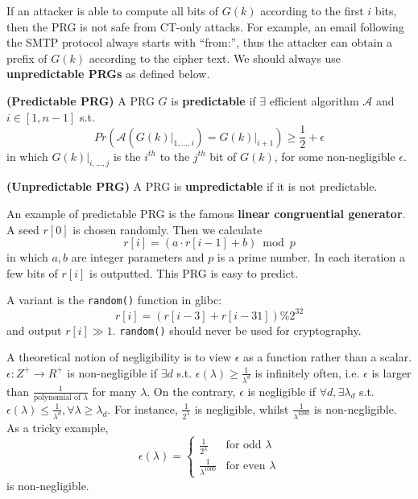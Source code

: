 If an attacker is able to compute all bits of $G(k)$ according to the first $i$ bits, then the PRG is not safe from CT-only attacks. For example, an email following the SMTP protocol always starts with ``from:'', thus the attacker can obtain a prefix of $G(k)$ according to the cipher text. We should always use \textbf{unpredictable PRGs} as defined below.
\begin{definition}\textbf{(Predictable PRG)}
A PRG $G$ is \textbf{predictable} if $\exists$ efficient algorithm $\mathcal{A}$ and $i\in[1,n-1]$ s.t. 
\begin{equation*}
Pr\left(\mathcal{A}\left(\left.G(k)\right\vert_{1,\dots,i}\right)=\left.G(k)\right\vert_{i+1}\right)\geq\frac{1}{2}+\epsilon
\end{equation*}
in which $G(k)\vert_{i,...,j}$ is the $i^{th}$ to the $j^{th}$ bit of ${G(k)}$, for some non-negligible $\epsilon$. 
\end{definition}
\begin{definition}\textbf{(Unpredictable PRG)}
A PRG is \textbf{unpredictable} if it is not predictable. 
\end{definition}
An example of predictable PRG is the famous \textbf{linear congruential generator}. A seed $r[0]$ is chosen randomly. Then we calculate
\begin{equation*}
r[i]=(a\cdot r[i-1]+b)\bmod p
\end{equation*}
in which $a,b$ are integer parameters and $p$ is a prime number. In each iteration a few bits of $r[i]$ is outputted. This PRG is easy to predict. 

A variant is the \texttt{random()} function in glibc:
\begin{equation*}
r[i]=(r[i-3]+r[i-31])\%2^{32}
\end{equation*}
and output $r[i]\gg 1$. \texttt{random()} should never be used for cryptography.

A theoretical notion of negligibility is to view $\epsilon$ as a function rather than a scalar. $\epsilon:Z^+\rightarrow R^+$ is non-negligible if $\exists d$ s.t. $\epsilon(\lambda)\geq\frac{1}{\lambda^d}$ is infinitely often, i.e. $\epsilon$ is larger than $\frac{1}{\text{polynomial of }\lambda}$ for many $\lambda$. On the contrary, $\epsilon$ is negligible if $\forall d,\exists \lambda_d$ s.t. $\epsilon(\lambda)\leq\frac{1}{\lambda^d},\forall\lambda\geq\lambda_d.$ For instance, $\frac{1}{2^\lambda}$ is negligible, whilst $\frac{1}{\lambda^{1000}}$ is non-negligible. As a tricky example, 
\[\epsilon(\lambda)=\begin{cases}
\frac{1}{2^\lambda}&\text{for odd }\lambda\\
\frac{1}{\lambda^{1000}}&\text{for even }\lambda
\end{cases}\]
is non-negligible.
